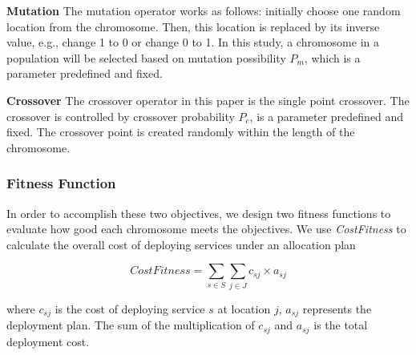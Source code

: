 \documentclass{llncs}
\begin{document}
\begin{flushleft}\textbf{Mutation} The mutation operator works as follows: initially choose one random location from the chromosome. 
Then, this location is replaced by its inverse value, e.g., change 1 to 0 or change 0 to 1.
In this study, a chromosome in a population will be selected based on mutation possibility $P_{m}$, which is 
a parameter predefined and fixed.
\end{flushleft}
\begin{flushleft}\textbf{Crossover} The crossover operator in this paper is the single point crossover. 
The crossover is controlled by crossover probability $P_{c}$, is a parameter predefined and fixed.
The crossover point is created randomly within the length of the chromosome. 
\end{flushleft}

\subsubsection{Fitness Function}
\label{sec:fitness_functions}
\begin{flushleft}In order to accomplish these two objectives, we design two fitness functions to evaluate 
how good each chromosome meets the objectives. We use \emph{CostFitness} to calculate the overall cost of deploying services under an allocation plan\end{flushleft}

\begin{equation}
	CostFitness = \sum\limits_{s \in S} \sum\limits_{j \in J} c_{sj} \times a_{sj}
\end{equation}

\begin{flushleft}where $c_{sj}$ is the cost of deploying service $s$ at location $j$, $a_{sj}$ represents the deployment plan. The sum of the multiplication of 
$c_{sj}$ and $a_{sj}$ is the total deployment cost.\end{flushleft}
\end{document}
